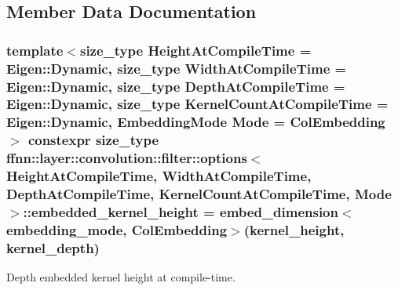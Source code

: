\subsection{Member Data Documentation}
\hypertarget{structffnn_1_1layer_1_1convolution_1_1filter_1_1options_a1f86b4cfe7a30523e5ff50d99708659a}{
\subsubsection[{embedded\-\_\-kernel\-\_\-height}]{\setlength{\rightskip}{0pt plus 5cm}template$<$size\-\_\-type Height\-At\-Compile\-Time = Eigen\-::\-Dynamic, size\-\_\-type Width\-At\-Compile\-Time = Eigen\-::\-Dynamic, size\-\_\-type Depth\-At\-Compile\-Time = Eigen\-::\-Dynamic, size\-\_\-type Kernel\-Count\-At\-Compile\-Time = Eigen\-::\-Dynamic, Embedding\-Mode Mode = Col\-Embedding$>$ constexpr {\bf size\-\_\-type} {\bf ffnn\-::layer\-::convolution\-::filter\-::options}$<$ Height\-At\-Compile\-Time, Width\-At\-Compile\-Time, Depth\-At\-Compile\-Time, Kernel\-Count\-At\-Compile\-Time, Mode $>$\-::embedded\-\_\-kernel\-\_\-height = {\bf embed\-\_\-dimension}$<${\bf embedding\-\_\-mode}, {\bf Col\-Embedding}$>$({\bf kernel\-\_\-height}, {\bf kernel\-\_\-depth})\hspace{0.3cm}{\ttfamily [static]}}}\label{structffnn_1_1layer_1_1convolution_1_1filter_1_1options_a1f86b4cfe7a30523e5ff50d99708659a}


Depth embedded kernel height at compile-\/time. 

